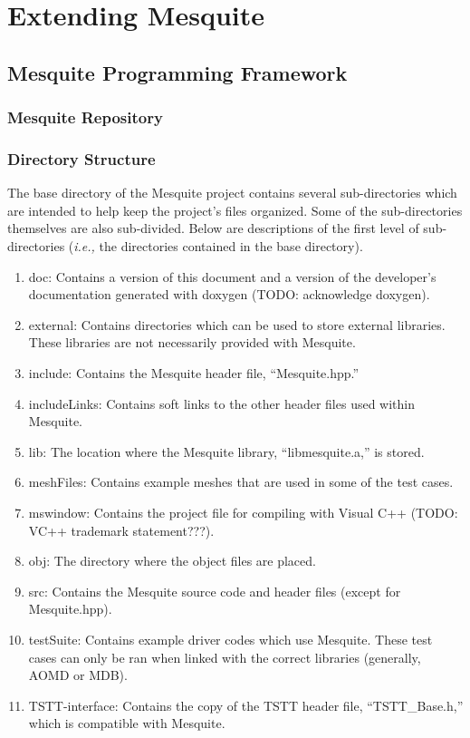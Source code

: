 \documentclass[letter]{report}
\begin{document}
\chapter{Extending Mesquite}

\section{Mesquite Programming Framework}

\subsection{Mesquite Repository} 

\subsection{Directory Structure}

The base directory of the Mesquite project contains several
sub-directories which are intended to help keep the project's
files organized.  Some of the sub-directories themselves are
also sub-divided.  Below are descriptions of the first level
of sub-directories ({\it i.e.,} the directories contained in the
base directory).
\begin{enumerate}
\item doc:  Contains a version of this document and a version of
the developer's documentation generated with doxygen (TODO: acknowledge
doxygen).
\item external:  Contains directories which can be used to store external
libraries.  These libraries are not necessarily provided with Mesquite.
\item include:  Contains the Mesquite header file, ``Mesquite.hpp.''
\item includeLinks:  Contains soft links to the other header files
used within Mesquite.  
\item lib:  The location where the Mesquite library, ``libmesquite.a,'' is
stored.
\item meshFiles:  Contains example meshes that are used in some of
the test cases.
\item mswindow:  Contains the project file for compiling with Visual C++
(TODO: VC++ trademark statement???).
\item obj:  The directory where the object files are placed.
\item src:  Contains the Mesquite source code and header files (except for
Mesquite.hpp).
\item testSuite:  Contains example driver codes which use Mesquite.  These
test cases can only be ran when linked with the correct libraries (generally,
AOMD or MDB).
\item TSTT-interface:  Contains the copy of the TSTT header file,
``TSTT\_Base.h,'' which is compatible with Mesquite.
\end{enumerate}
\end{document}
